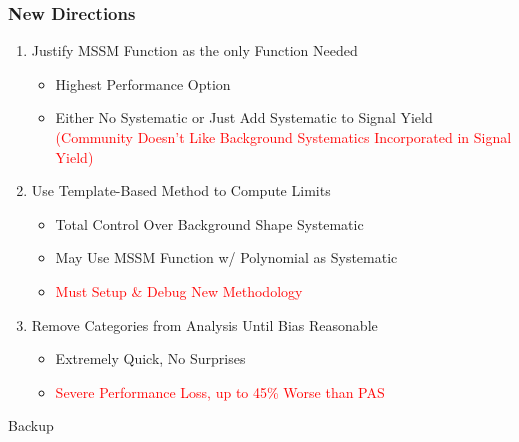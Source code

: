 \documentclass{beamer}
\newcommand{\tred}[1]{\textcolor{red}{#1}}
\begin{document}
\begin{frame}
\frametitle{New Directions}
  \begin{enumerate}
    \item Justify MSSM Function as the only Function Needed
    \begin{itemize}
      \item Highest Performance Option
      \item Either No Systematic or Just Add Systematic to Signal Yield \tred{(Community Doesn't Like Background Systematics Incorporated in Signal Yield)}
    \end{itemize}
    \item Use Template-Based Method to Compute Limits
    \begin{itemize}
      \item Total Control Over Background Shape Systematic
      \item May Use MSSM Function w/ Polynomial as Systematic 
      \item \tred{Must Setup \& Debug New Methodology}
    \end{itemize}
    \item Remove Categories from Analysis Until Bias Reasonable
    \begin{itemize}
      \item Extremely Quick, No Surprises
      \item \tred{Severe Performance Loss, up to 45\% Worse than PAS}
    \end{itemize}
  \end{enumerate}
\end{frame}


\begin{frame}
  \begin{center}
    \Huge
    Backup
  \end{center}
\end{frame}

\end{document}
